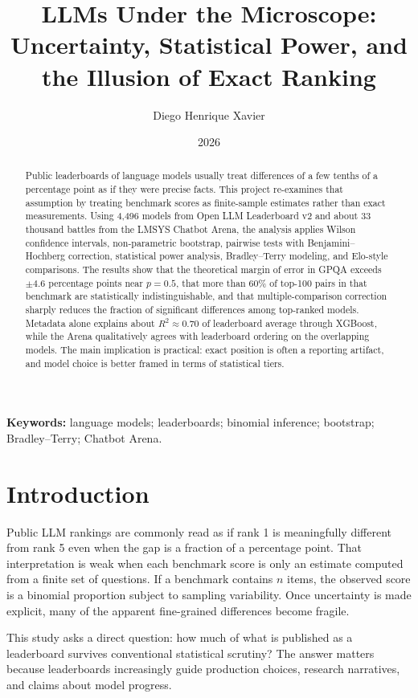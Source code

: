 \documentclass[11pt,a4paper]{article}
\title{LLMs Under the Microscope:\\Uncertainty, Statistical Power, and the Illusion of Exact Ranking}
\author{Diego Henrique Xavier}
\date{2026}
\begin{document}
\maketitle

\begin{abstract}
Public leaderboards of language models usually treat differences of a few tenths of a percentage point as if they were precise facts. This project re-examines that assumption by treating benchmark scores as finite-sample estimates rather than exact measurements. Using 4,496 models from Open LLM Leaderboard v2 and about 33 thousand battles from the LMSYS Chatbot Arena, the analysis applies Wilson confidence intervals, non-parametric bootstrap, pairwise tests with Benjamini--Hochberg correction, statistical power analysis, Bradley--Terry modeling, and Elo-style comparisons. The results show that the theoretical margin of error in GPQA exceeds \(\pm 4.6\) percentage points near \(p=0.5\), that more than 60\% of top-100 pairs in that benchmark are statistically indistinguishable, and that multiple-comparison correction sharply reduces the fraction of significant differences among top-ranked models. Metadata alone explains about \(R^2 \approx 0.70\) of leaderboard average through XGBoost, while the Arena qualitatively agrees with leaderboard ordering on the overlapping models. The main implication is practical: exact position is often a reporting artifact, and model choice is better framed in terms of statistical tiers.
\end{abstract}

\textbf{Keywords:} language models; leaderboards; binomial inference; bootstrap; Bradley--Terry; Chatbot Arena.

\section{Introduction}
Public LLM rankings are commonly read as if rank 1 is meaningfully different from rank 5 even when the gap is a fraction of a percentage point. That interpretation is weak when each benchmark score is only an estimate computed from a finite set of questions. If a benchmark contains \(n\) items, the observed score is a binomial proportion subject to sampling variability. Once uncertainty is made explicit, many of the apparent fine-grained differences become fragile.

This study asks a direct question: how much of what is published as a leaderboard survives conventional statistical scrutiny? The answer matters because leaderboards increasingly guide production choices, research narratives, and claims about model progress.
\end{document}
